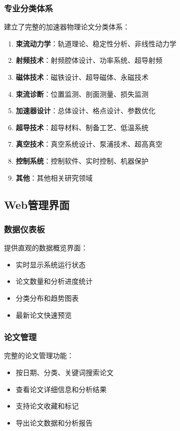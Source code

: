 \documentclass[12pt,a4paper]{article}
\begin{document}
\subsubsection{专业分类体系}
建立了完整的加速器物理论文分类体系：
\begin{enumerate}
    \item \textbf{束流动力学}：轨道理论、稳定性分析、非线性动力学
    \item \textbf{射频技术}：射频腔体设计、功率系统、超导射频
    \item \textbf{磁体技术}：磁铁设计、超导磁体、永磁技术
    \item \textbf{束流诊断}：位置监测、剖面测量、损失监测
    \item \textbf{加速器设计}：总体设计、格点设计、参数优化
    \item \textbf{超导技术}：超导材料、制备工艺、低温系统
    \item \textbf{真空技术}：真空系统设计、泵浦技术、超高真空
    \item \textbf{控制系统}：控制软件、实时控制、机器保护
    \item \textbf{其他}：其他相关研究领域
\end{enumerate}

\subsection{Web管理界面}

\subsubsection{数据仪表板}
提供直观的数据概览界面：
\begin{itemize}
    \item 实时显示系统运行状态
    \item 论文数量和分析进度统计
    \item 分类分布和趋势图表
    \item 最新论文快速预览
\end{itemize}

\subsubsection{论文管理}
完整的论文管理功能：
\begin{itemize}
    \item 按日期、分类、关键词搜索论文
    \item 查看论文详细信息和分析结果
    \item 支持论文收藏和标记
    \item 导出论文数据和分析报告
\end{itemize}
\end{document}
